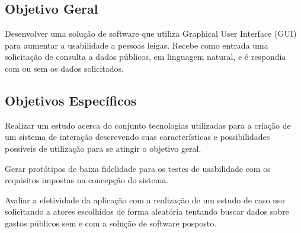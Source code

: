 \subsection{Objetivo Geral}
Desenvolver uma solução de software que utiliza Graphical User Interface (GUI) para aumentar a usabilidade a pessoas leigas. Recebe como entrada uma solicitação de consulta  a dados públicos, em linguagem natural, e é respondia com ou sem os dados solicitados.

\subsection{Objetivos Específicos}
Realizar um estudo acerca do conjunto tecnologias utilizadas para a criação de um sistema de interação descrevendo suas características e possibilidades possíveis de utilização para se atingir o objetivo geral.

Gerar protótipos de baixa fidelidade para os testes de usabilidade com os requisitos impostas na concepção do sistema.

Avaliar a efetividade da aplicação com a realização de um estudo de caso uso solicitando a atores escolhidos de forma aleatória tentando buscar dados sobre gastos públicos sem e com a solução de software posposto.
